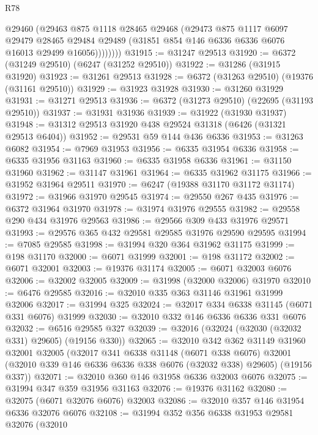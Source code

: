 \begin{lexlean}{R78}
\begin{coremodule}
              @29460
              (@29463
                @875
                @1118
                @28465
                @29468
                (@29473
                  @875
                  @1117
                  @6097
                  @29479
                  @28465
                  @29484
                  @29489
                  (@31851 @854 @146 @6336 @6336 @6076 @16013 @29499 @16056))))))))
@31915 := @31247 @29513
@31920 := @6372 (@31249 @29510) (@6247 (@31252 @29510))
@31922 := @31286 (@31915 @31920)
@31923 := @31261 @29513
@31928 := @6372 (@31263 @29510) (@19376 (@31161 @29510))
@31929 := @31923 @31928
@31930 := @31260 @31929
@31931 := @31271 @29513
@31936 := @6372 (@31273 @29510) (@22695 (@31193 @29510))
@31937 := @31931 @31936
@31939 := @31922 (@31930 @31937)
@31948 := @31312 @29513 @31920 @438 @29524 @31318 (@6426 (@31321 @29513 @6404))
@31952 := @29531 @59 @144 @436 @6336
@31953 := @31263 @6082
@31954 := @7969 @31953
@31956 := @6335 @31954 @6336
@31958 := @6335 @31956 @31163
@31960 := @6335 @31958 @6336
@31961 := @31150 @31960
@31962 := @31147 @31961
@31964 := @6335 @31962 @31175
@31966 := @31952 @31964 @29511
@31970 := @6247 (@19388 @31170 @31172 @31174)
@31972 := @31966 @31970 @29545
@31974 := @29550 @267 @435
@31976 := @6372 @31964 @31970
@31978 := @31974 @31976 @29555
@31982 := @29558 @290 @434 @31976 @29563
@31986 := @29566 @309 @433 @31976 @29571
@31993 := @29576 @365 @432 @29581 @29585 @31976 @29590 @29595
@31994 := @7085 @29585
@31998 := @31994 @320 @364 @31962 @31175
@31999 := @198 @31170
@32000 := @6071 @31999
@32001 := @198 @31172
@32002 := @6071 @32001
@32003 := @19376 @31174
@32005 := @6071 @32003 @6076
@32006 := @32002 @32005
@32009 := @31998 (@32000 @32006) @31970
@32010 := @6476 @29585
@32016 := @32010 @335 @363 @31146 @31961 @31999 @32006
@32017 := @31994 @325
@32024 := @32017 @334 @6338 @31145 (@6071 @331 @6076) @31999
@32030 := @32010 @332 @146 @6336 @6336 @331 @6076
@32032 := @6516 @29585 @327
@32039 := @32016 (@32024 (@32030 (@32032 @331) @29605) (@19156 @330))
@32065 := @32010
    @342
    @362
    @31149
    @31960
    @32001
    @32005
    (@32017
      @341
      @6338
      @31148
      (@6071 @338 @6076)
      @32001
      (@32010 @339 @146 @6336 @6336 @338 @6076 (@32032 @338) @29605)
      (@19156 @337))
@32071 := @32010 @360 @146 @31958 @6336 @32003 @6076
@32075 := @31994 @347 @359 @31956 @31163
@32076 := @19376 @31162
@32080 := @32075 (@6071 @32076 @6076) @32003
@32086 := @32010 @357 @146 @31954 @6336 @32076 @6076
@32108 := @31994
    @352
    @356
    @6338
    @31953
    @29581
    @32076
    (@32010

\end{coremodule}
\end{lexlean}
